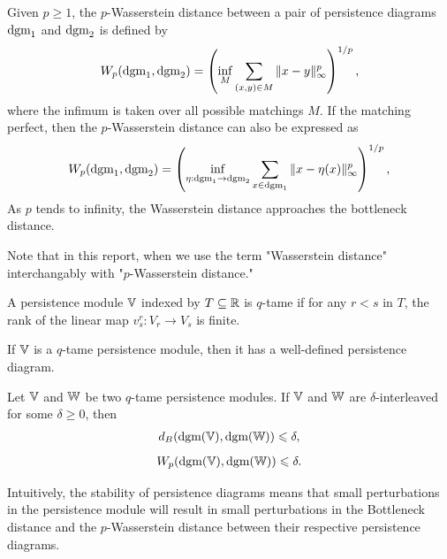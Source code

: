 \begin{defn}

Given $p\geq 1$, the $p$-Wasserstein distance between a pair of persistence diagrams $\text{dgm}_1$ and $\text{dgm}_2$ is defined by 
\begin{align}
    W_p(\text{dgm}_1, \text{dgm}_2) = \left(\inf_M \sum_{(x,y)\in M}\|x-y\|^p_\infty\right)^{1/p},
\end{align}
where the infimum is taken over all possible matchings $M$.
If the matching perfect, then the $p$-Wasserstein distance can also be expressed as 
\begin{align}
    W_p(\text{dgm}_1, \text{dgm}_2) = \left(\inf_{\eta: \text{dgm}_1 \to \text{dgm}_2} \sum_{x \in \text{dgm}_1}\|x-\eta(x)\|^p_\infty\right)^{1/p},
\end{align}
As $p$ tends to infinity, the Wasserstein distance approaches
the bottleneck distance.

Note that in this report, when we use the term "Wasserstein distance" interchangably with "$p$-Wasserstein distance."
\end{defn}
\begin{defn}
A persistence module $\mathbb{V}$ indexed by $T\subseteq \mathbb R$ is $q$-tame if for any $r<s$ in $T$, the rank of the linear map $v^r_s: V_r\to V_s$ is finite.
\end{defn}

\begin{thm}
If $\mathbb{V}$ is a $q$-tame persistence module, then it has a well-defined persistence diagram. 
\end{thm}

\begin{thm}
Let $\mathbb{V}$ and $\mathbb{W}$ 
be two $q$-tame persistence modules. If $\mathbb{V}$ and $\mathbb{W}$ are $\delta$-interleaved for some $\delta \geq 0$, then 
\begin{align}
    d_B(\text{dgm}(\mathbb{V}),\text{dgm}(\mathbb{W})) \leqslant \delta,
\end{align}
\begin{align}
    W_p(\text{dgm}(\mathbb{V}),\text{dgm}(\mathbb{W})) \leqslant \delta.
\end{align}
\end{thm}

Intuitively, the stability of persistence diagrams means that small perturbations in the persistence module will result in small perturbations in the Bottleneck distance and the $p$-Wasserstein distance between their respective persistence diagrams.

